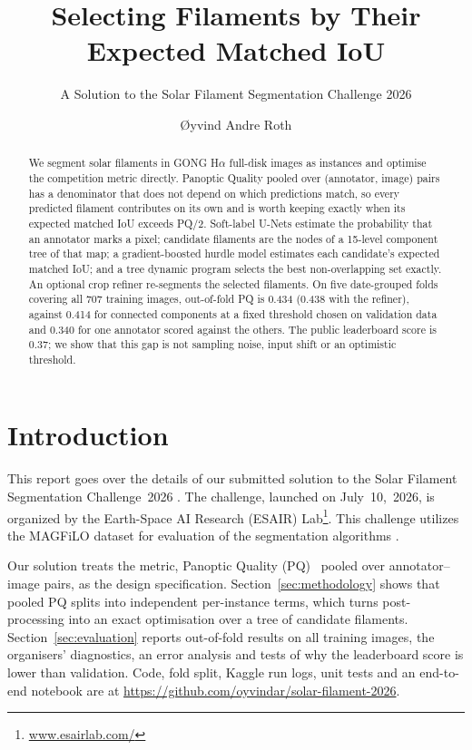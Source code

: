 \documentclass[sigconf]{acmart}
\begin{document}
\title{Selecting Filaments by Their Expected Matched IoU}
\subtitle{A Solution to the Solar Filament Segmentation Challenge 2026}
\author{{\O}yvind Andre Roth}

\begin{abstract}
We segment solar filaments in GONG H$\alpha$ full-disk images as instances and optimise the competition metric directly. Panoptic Quality pooled over (annotator, image) pairs has a denominator that does not depend on which predictions match, so every predicted filament contributes on its own and is worth keeping exactly when its expected matched IoU exceeds PQ/2. Soft-label U-Nets estimate the probability that an annotator marks a pixel; candidate filaments are the nodes of a 15-level component tree of that map; a gradient-boosted hurdle model estimates each candidate's expected matched IoU; and a tree dynamic program selects the best non-overlapping set exactly. An optional crop refiner re-segments the selected filaments. On five date-grouped folds covering all 707 training images, out-of-fold PQ is 0.434 (0.438 with the refiner), against 0.414 for connected components at a fixed threshold chosen on validation data and 0.340 for one annotator scored against the others. The public leaderboard score is 0.37; we show that this gap is not sampling noise, input shift or an optimistic threshold.
\end{abstract}
\maketitle

\section{Introduction}
This report goes over the details of our submitted solution to the Solar Filament Segmentation Challenge~2026 \cite{filament-segmentation-2026}. The challenge, launched on July~10,~2026, is organized by the Earth-Space AI Research (ESAIR) Lab\footnote{\href{https://www.esairlab.com/home}{www.esairlab.com/}}. This challenge utilizes the MAGFiLO dataset for evaluation of the segmentation algorithms \cite{ahmadzadeh2024dataset}.

Our solution treats the metric, Panoptic Quality (PQ)~\cite{kirillov2019panoptic} pooled over annotator--image pairs, as the design specification. Section~\ref{sec:methodology} shows that pooled PQ splits into independent per-instance terms, which turns post-processing into an exact optimisation over a tree of candidate filaments. Section~\ref{sec:evaluation} reports out-of-fold results on all training images, the organisers' diagnostics, an error analysis and tests of why the leaderboard score is lower than validation. Code, fold split, Kaggle run logs, unit tests and an end-to-end notebook are at \url{https://github.com/oyvindar/solar-filament-2026}.
\end{document}
